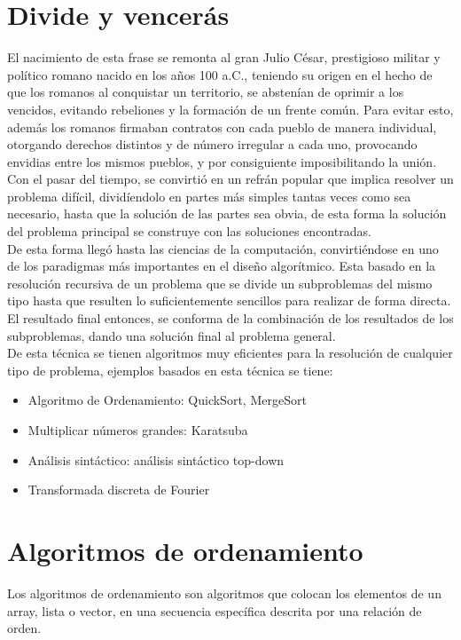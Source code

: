 \section*{Divide y vencerás}
    El nacimiento de esta frase se remonta al gran Julio César, prestigioso militar y político romano nacido en los años 100 a.C., teniendo su origen en el hecho de que los romanos al conquistar un territorio, se abstenían de oprimir a los vencidos, evitando rebeliones y la formación de un frente común. Para evitar esto, además los romanos firmaban contratos con cada pueblo de manera individual, otorgando derechos distintos y de número irregular a cada uno, provocando envidias entre los mismos pueblos, y por consiguiente imposibilitando la unión.\\
    
    Con el pasar del tiempo, se convirtió en un refrán popular que implica resolver un problema difícil, dividíendolo en partes más simples tantas veces como sea necesario, hasta que la solución de las partes sea obvia, de esta forma la solución del problema principal se construye con las soluciones encontradas.\\
    
    De esta forma llegó hasta las ciencias de la computación, convirtiéndose en uno de los paradigmas más importantes en el diseño algorítmico. Esta basado en la resolución recursiva de un problema que se divide un subproblemas del mismo tipo hasta que resulten lo suficientemente sencillos para realizar de forma directa. El resultado final entonces, se conforma de la combinación  de los resultados de los subproblemas, dando una solución final al problema general.\\
    
    De esta técnica se tienen algoritmos muy eficientes para la resolución de cualquier tipo de problema, ejemplos basados en esta técnica se tiene:\\
    \begin{itemize}
        \item Algoritmo de Ordenamiento: QuickSort, MergeSort
        \item Multiplicar números grandes: Karatsuba
        \item Análisis sintáctico: análisis sintáctico top-down
        \item Transformada discreta de Fourier
    \end{itemize}
    
\section*{Algoritmos de ordenamiento}
    Los algoritmos de ordenamiento son algoritmos que colocan los elementos de un array, lista o vector, en una secuencia específica descrita por una relación de orden.\\
    
